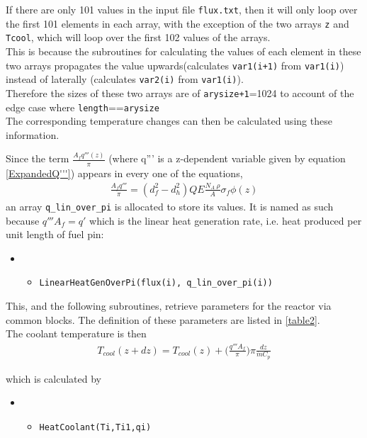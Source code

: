\documentclass[a4paper, 12pt]{article}
\begin{document}
If there are only 101 values in the input file \texttt{flux.txt}, then it will only loop over the first 101 elements in each array, with the exception of the two arrays \texttt{z} and \texttt{Tcool}, which will loop over the first 102 values of the arrays. \\
This is because the subroutines for calculating the values of each element in these two arrays propagates the value upwards(calculates \texttt{var1(i+1)} from \texttt{var1(i)}) instead of laterally (calculates \texttt{var2(i)} from \texttt{var1(i)}).\\
Therefore the sizes of these two arrays are of \texttt{arysize+1}=1024 to account of the edge case where \texttt{length}==\texttt{arysize}\\

The corresponding temperature changes can then be calculated using these information.

Since the term $\frac{A_f q'''(z)}{\pi}$ (where q''' is a z-dependent variable given by equation \ref{ExpandedQ'''}) appears in every one of the equations,
\begin{align}
\frac{A_f q'''}{\pi} = (d_f^2-d_h^2) Q E \frac{N_A \:\rho}{A} \sigma_f \phi(z) \label{Afq'''pi}
\end{align}
an array \texttt{q\_lin\_over\_pi} is allocated to store its values. It is named as such because $q''' A_f = q'$ which is the linear heat generation rate, i.e. heat produced per unit length of fuel pin:
\begin{itemize}
	\item[]
	\begin{itemize}
	\item \texttt{\textcolor{subr}{LinearHeatGenOverPi}(flux(i), q\_lin\_over\_pi(i))}
	\end  {itemize}
\end  {itemize}
This, and the following subroutines, retrieve parameters for the reactor via common blocks. The definition of these parameters are listed in \ref{table2}.\\

The coolant temperature is then 
\begin{align}\label{Tcool}
T_{cool}(z+dz)= T_{cool}(z)+ \bigg(\frac{q''' A_f}{\pi}\bigg) \pi \frac{dz}{\dot{m}C_p}
\end{align}

which is calculated by
\begin{itemize}
	\item[]
	\begin{itemize}
	\item \texttt{\textcolor{subr}{HeatCoolant}(Ti,Ti1,qi)}
	\end{itemize}
\end{itemize}
\end{document}
